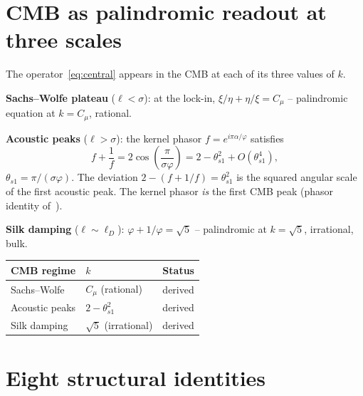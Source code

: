 \documentclass[twocolumn,10pt]{article}
\newcommand{\vp}{\varphi}
\newcommand{\lD}{\ell_D}
\begin{document}
\bigskip{}
\medskip

\section{CMB as palindromic readout at three scales}
\label{sec:bridge}

The operator~\eqref{eq:central} appears in the CMB at each of its
three values of $k$.

\textbf{Sachs--Wolfe plateau} ($\ell<\sigma$): at the lock-in,
$\xi/\eta+\eta/\xi=C_\mu$ -- palindromic equation at $k=C_\mu$,
rational.

\textbf{Acoustic peaks} ($\ell>\sigma$): the kernel phasor
$f=e^{i\pi\alpha/\vp}$ satisfies
\begin{equation}
  f+\frac{1}{f}=2\cos\!\!\left(\frac{\pi}{\sigma\vp}\right)
  =2-\theta_{s1}^2+O(\theta_{s1}^4),
\end{equation}
$\theta_{s1}=\pi/(\sigma\vp)$. The deviation $2-(f+1/f)=\theta_{s1}^2$
is the squared angular scale of the first acoustic peak. The kernel
phasor \emph{is} the first CMB peak
(phasor identity of~\cite{CamKer163}).

\textbf{Silk damping} ($\ell\sim\lD$): $\vp+1/\vp=\sqrt{5}$ --
palindromic at $k=\sqrt{5}$, irrational, bulk.

\begin{center}
{\small\renewcommand{\arraystretch}{1.3}
\begin{tabular}{lll}
\toprule
CMB regime & $k$ & Status \\
\midrule
Sachs--Wolfe & $C_\mu$ (rational) & derived \\
Acoustic peaks & $2-\theta_{s1}^2$ & derived \\
Silk damping & $\sqrt{5}$ (irrational) & derived \\
\bottomrule
\end{tabular}}
\end{center}

\section{Eight structural identities}
\label{sec:identities}
\end{document}
